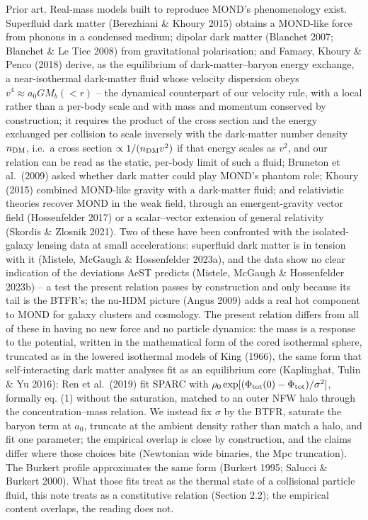 \documentclass[
  10pt,
]{article}
\begin{document}
Prior art. Real-mass models built to reproduce MOND's phenomenology
exist. Superfluid dark matter (Berezhiani \& Khoury 2015)
obtains a MOND-like force from phonons in a condensed medium; dipolar
dark matter (Blanchet 2007; Blanchet \& Le Tiec 2008) from gravitational
polarisation; and Famaey, Khoury \& Penco (2018) derive, as the equilibrium of dark-matter--baryon energy exchange, a near-isothermal dark-matter fluid whose velocity dispersion obeys $v^4\approx a_0GM_b(<r)$ -- the dynamical counterpart of our velocity rule, with a local rather than a per-body scale and with mass and momentum conserved by construction; it requires the product of the cross section and the energy exchanged per collision to scale inversely with the dark-matter number density $n_{\rm DM}$, i.e.\ a cross section $\propto1/(n_{\rm DM}v^2)$ if that energy scales as $v^2$, and our relation can be read as the static, per-body limit of such a fluid; Bruneton et al.~(2009) asked whether dark matter could play
MOND's phantom role; Khoury (2015) combined MOND-like gravity with a dark-matter fluid; and relativistic theories recover MOND in the weak field, through an emergent-gravity vector field (Hossenfelder 2017) or a scalar--vector extension of general relativity (Skordis \& Zlosnik 2021). Two of these have been confronted with the isolated-galaxy lensing data at small accelerations: superfluid dark matter is in tension with it (Mistele, McGaugh \& Hossenfelder 2023a), and the data show no clear indication of the deviations AeST predicts (Mistele, McGaugh \& Hossenfelder 2023b) -- a test the present relation passes by construction and only because its tail is the BTFR's; the nu-HDM picture (Angus 2009) adds a real hot component to MOND
for galaxy clusters and cosmology. The present relation differs from all of these in
having no new force and no particle dynamics: the mass is a response to
the potential, written in the mathematical form of the cored isothermal
sphere, truncated as in the lowered isothermal models of King (1966), the same form that self-interacting dark matter analyses fit as an equilibrium core (Kaplinghat, Tulin \& Yu 2016): Ren et al.~(2019) fit SPARC with $\rho_0\exp[(\Phi_{\rm tot}(0)-\Phi_{\rm tot})/\sigma^2]$, formally eq. (1) without the saturation, matched to an outer NFW halo through the concentration--mass relation. We instead fix $\sigma$ by the BTFR, saturate the baryon term at $a_0$, truncate at the ambient density rather than match a halo, and fit one parameter; the empirical overlap is close by construction, and the claims differ where those choices bite (Newtonian wide binaries, the Mpc truncation). The Burkert profile approximates the same form
(Burkert 1995; Salucci \& Burkert 2000). What those fits treat as the
thermal state of a collisional particle fluid, this note treats as a constitutive relation (Section 2.2); the empirical content overlaps, the
reading does not.
\end{document}
